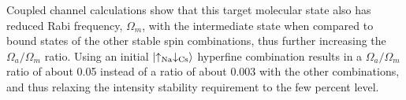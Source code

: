 \documentclass[aps,prl,twocolumn,10pt,superscriptaddress]{revtex4-1}
\newcommand{\Na}{\mathrm{Na}}
\newcommand{\Cs}{\mathrm{Cs}}
\begin{document}
Coupled channel calculations show that this target molecular state also has reduced Rabi frequency, $ \Omega_m $,
with the intermediate state when compared to bound states of the other stable spin combinations, thus further increasing the $\Omega_a/\Omega_m$ ratio.
Using an initial $\ket{\uparrow_{\Na} \downarrow_{\Cs}}$ hyperfine combination
results in a $ \Omega_a/\Omega_m$ ratio of about 0.05 instead of a ratio of about 0.003
with the other combinations, and thus relaxing the intensity stability requirement to the few percent level. %
\end{document}
